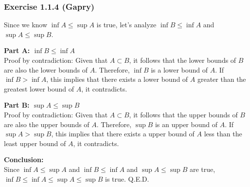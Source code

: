 \subsubsection*{Exercise 1.1.4 (Gapry)}

\begin{flushleft}
Since we know $\inf A \le \sup A$ is true, let's analyze $\inf B \le \inf A$ and $\sup A \le \sup B$.

\textbf{Part A: $\inf B \le \inf A$} \\
Proof by contradiction: 
Given that $A \subset B$, it follows that the lower bounds of $B$ are also the lower bounds of $A$. 
Therefore, $\inf B$ is a lower bound of $A$. If $\inf B > \inf A$, 
this implies that there exists a lower bound of $A$ greater than the greatest lower bound of $A$, 
it contradicts.

\textbf{Part B: $\sup A \le \sup B$} \\
Proof by contradiction: 
Given that $A \subset B$, it follows that the upper bounds of $B$ are also the upper bounds of $A$. 
Therefore, $\sup B$ is an upper bound of $A$. If $\sup A > \sup B$, 
this implies that there exists a upper bound of $A$ less than the least upper bound of $A$, 
it contradicts.

\textbf{Conclusion:} \\
Since $\inf A \le \sup A$ and $\inf B \le \inf A$ and $\sup A \le \sup B$ are true, 
$\inf B \le \inf A \le \sup A \le \sup B$ is true. Q.E.D.
\end{flushleft}
